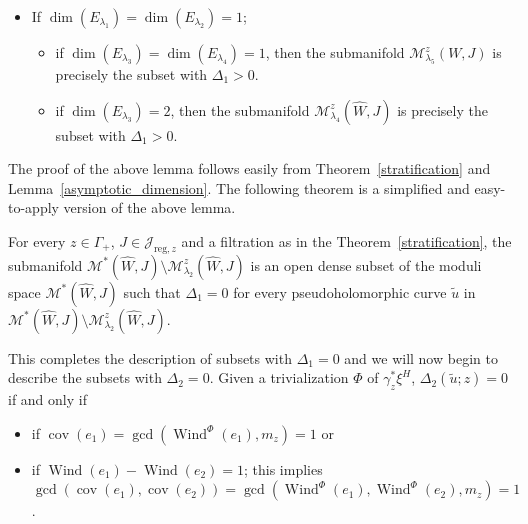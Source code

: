 \documentclass[11pt, a4paper]{amsart}
\newcommand{\cJ}{\mathcal{J}}
\newcommand{\cM}{\mathcal{M}}
\DeclareMathOperator{\wind}{Wind}
\DeclareMathOperator{\cov}{cov}
\begin{document}
\begin{lemma}
\begin{enumerate}[topsep=5pt,itemsep=5pt]
\begin{itemize}[topsep=5pt,itemsep=5pt]
    \begin{itemize}[topsep=5pt,itemsep=5pt]
        \item if $\dim(E_{\lambda_2})=\dim(E_{\lambda_3})=1$, then the submanifold $\cM^z_{\lambda_4}(\widehat{W},J)$ is precisely the subset with $\Delta_1>0$.
        \item if $\dim(E_{\lambda_2})=2$, then the submanifold $\cM^z_{\lambda_3}(\widehat{W},J)$ is precisely the subset with $\Delta_1>0$.
    \end{itemize}
    \item If $\dim(E_{\lambda_1})=\dim(E_{\lambda_2})=1$;
    \begin{itemize}[topsep=5pt,itemsep=5pt]
        \item if $\dim(E_{\lambda_3})=\dim(E_{\lambda_4})=1$, then the submanifold $\cM^z_{\lambda_5}(W,J)$ is precisely the subset with $\Delta_1>0$.
        \item if $\dim(E_{\lambda_3})=2$, then the submanifold $\cM^z_{\lambda_4}(\widehat{W},J)$ is precisely the subset with $\Delta_1>0$.
    \end{itemize}
\end{itemize}
    
    
\end{enumerate}


\end{lemma}

The proof of the above lemma follows easily from Theorem~\ref{stratification} and Lemma~\ref{asymptotic_dimension}. The following theorem is a simplified and easy-to-apply version of the above lemma.

\begin{theorem}\label{delta1=0}
For every $z\in \Gamma_+$, $J \in \cJ_{\mathrm{reg},z}$ and a filtration as in the Theorem~\ref{stratification}, the submanifold $\cM^*(\widehat{W},J)\setminus \cM^z_{\lambda_2}(\widehat{W},J)$ is an open dense subset of the moduli space $\cM^*(\widehat{W},J)$ such that $\Delta_1=0$ for every pseudoholomorphic curve $\tilde{u}$ in $\cM^*(\widehat{W},J)\setminus \cM^z_{\lambda_2}(\widehat{W},J)$.
\end{theorem}



This completes the description of subsets with $\Delta_1=0$ and we will now begin to describe the subsets with $\Delta_2=0$. Given a trivialization $\Phi$ of $\gamma_z^* \xi^{H}$, $\Delta_2 (\tilde{u}; z) = 0$  if and only if 
\begin{itemize}[topsep=5pt,itemsep=5pt]
    \item if $\cov(e_1)=\gcd(\wind^{\Phi}(e_1),m_z)=1$ or
    \item if $\wind(e_1)-\wind(e_2)=1$; this implies\\ $\gcd(\cov(e_1), \cov(e_2))=\gcd(\wind^{\Phi}(e_1),\wind^{\Phi}(e_2),m_z)=1$.
\end{itemize}
\end{document}
